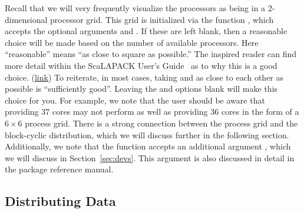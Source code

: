 Recall that we will very frequently visualize the processors as being in a 2-dimensional processor grid.  This grid is initialized via the function , which accepts the optional arguments  and .  If these are left blank, then a reasonable choice will be made based on the number of available processors.  Here ``reasonable'' means ``as close to square as possible.''  The inspired reader can find more detail within the ScaLAPACK User's Guide~\citep{slug} as to why this is a good choice. (\href{http://www.netlib.org/utk/papers/scalapack/node20.html}{link})
\np
To reiterate, in most cases, taking  and  as close to each other as possible is ``sufficiently good''.  Leaving the  and  options blank will make this choice for you.  For example, we note that the user should be aware that providing 37 cores may not perform as well as providing 36 cores in the form of a $6\times6$ process grid.  There is a strong connection between the process grid and the block-cyclic distribution, which we will discuss further in the following section.
\np
Additionally, we note that the  function accepts an additional argument , which we will discuss in Section~\ref{sec:devs}.  This argument is also discussed in detail in the package reference manual.

\subsection[]{Distributing Data}

